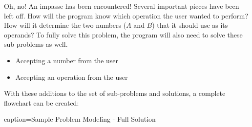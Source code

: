 \documentclass[../main.tex]{subfiles}
\begin{document}
Oh, no! An impasse has been encountered! Several important pieces have been left off.
How will the program know which operation the user wanted to perform? How will it
determine the two numbers ($A$ and $B$) that it should use as its operands? To fully 
solve this problem, the program will also need to solve these sub-problems as well.

\begin{itemize}
	\item Accepting a number from the user
	\item Accepting an operation from the user
\end{itemize}

With these additions to the set of sub-problems and solutions, a complete flowchart
can be created:

\begin{obifig}{caption=Sample Problem Modeling - Full Solution}
\end{obifig}
\end{document}
